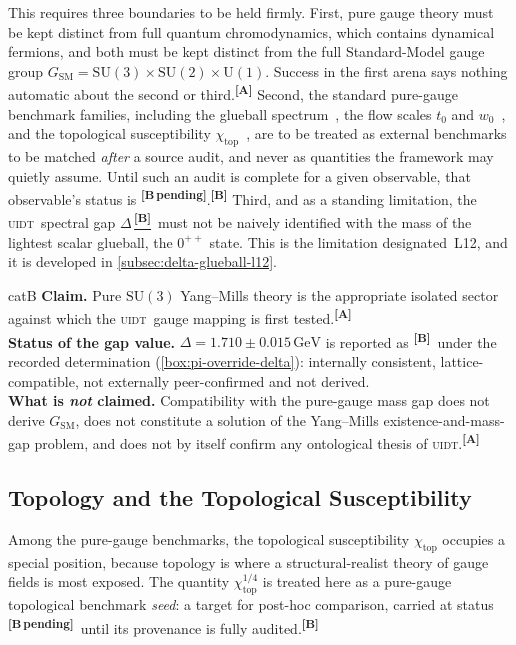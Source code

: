 \documentclass[12pt,a4paper,twoside]{article}
\theoremstyle{plain}
\theoremstyle{definition}
\theoremstyle{remark}
\newcommand{\UIDT}{\textsc{uidt}}
\newcommand{\GeV}{\,\mathrm{GeV}}
\newcommand{\catmark}[1]{\textsuperscript{\textsf{\textbf{[#1]}}}}
\newcommand{\Bdelta}{\hyperref[box:pi-override-delta]{\catmark{B}}}
\newcommand{\Bpending}{\catmark{B\,pending}}
\newcommand{\DeltaGap}{1.710 \pm 0.015\GeV} %
\begin{document}
This requires three boundaries to be held firmly. First, pure gauge theory must be kept distinct from full quantum chromodynamics, which contains dynamical fermions, and both must be kept distinct from the full Standard-Model gauge group $G_{\mathrm{SM}} = \mathrm{SU}(3)\times\mathrm{SU}(2)\times\mathrm{U}(1)$. Success in the first arena says nothing automatic about the second or third.\catmark{A} Second, the standard pure-gauge benchmark families, including the glueball spectrum~\cite{morningstar1999,michael1989,athenodorou2020,athenodorou2021}, the flow scales $t_0$ and $w_0$~\cite{luscher2010}, and the topological susceptibility $\chi_{\mathrm{top}}$~\cite{durr2007}, are to be treated as external benchmarks to be matched \emph{after} a source audit, and never as quantities the framework may quietly assume. Until such an audit is complete for a given observable, that observable's status is \Bpending.\catmark{B} Third, and as a standing limitation, the \UIDT\ spectral gap $\Delta$\,\Bdelta\ must not be naively identified with the mass of the lightest scalar glueball, the $0^{++}$ state. This is the limitation designated~L12, and it is developed in \cref{subsec:delta-glueball-l12}.

\begin{evidencebox}{catB}
\textbf{Claim.} Pure $\mathrm{SU}(3)$ Yang--Mills theory is the appropriate isolated sector against which the \UIDT\ gauge mapping is first
tested.\catmark{A}\\[0.3em]
\textbf{Status of the gap value.} $\Delta = \DeltaGap$ is reported as \catmark{B}\ under the recorded determination (\cref{box:pi-override-delta}): internally consistent, lattice-compatible, not externally peer-confirmed and not
derived.\\[0.3em]
\textbf{What is \emph{not} claimed.} Compatibility with the pure-gauge mass gap does not derive $G_{\mathrm{SM}}$, does not constitute a solution of the Yang--Mills existence-and-mass-gap problem, and does not by itself confirm any ontological thesis of \UIDT.\catmark{A}
\end{evidencebox}

\subsection{Topology and the Topological Susceptibility}
\label{subsec:topology-chi}

Among the pure-gauge benchmarks, the topological susceptibility $\chi_{\mathrm{top}}$ occupies a special position, because topology is where a structural-realist theory of gauge fields is most exposed. The quantity $\chi_{\mathrm{top}}^{1/4}$ is treated here as a pure-gauge topological benchmark \emph{seed}: a target for post-hoc comparison, carried at status \Bpending\ until its provenance is fully audited.\catmark{B}
\end{document}
